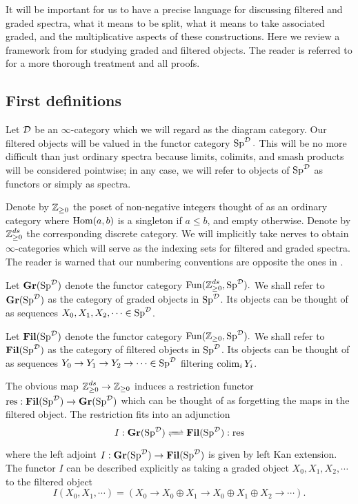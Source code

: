 
It will be important for us to have a precise language for discussing filtered and graded spectra, what it means to be split, what it means to take associated graded, and the multiplicative aspects of these constructions. Here we review a framework from \cite{LurieRot} for studying graded and filtered objects.  The reader is referred to \cite{LurieRot} for a more thorough treatment and all proofs.  

\subsection{First definitions}
Let $\operatorname{\mathcal{D}}$ be an $\infty$-category which we will regard as the diagram category.  Our filtered objects will be valued in the functor category $\operatorname{\mathrm{Sp}}^{\operatorname{\mathcal{D}}}.$  This will be no more difficult than just ordinary spectra because limits, colimits, and smash products will be considered pointwise; in any case, we will refer to objects of $\operatorname{\mathrm{Sp}}^{\operatorname{\mathcal{D}}}$ as functors or simply as spectra.  

Denote by $\operatorname{\mathbb{Z}}_{\geq 0}$ the poset of non-negative integers thought of as an ordinary category where $\operatorname{\text{Hom}}(a,b)$ is a singleton if $a\leq b$, and empty otherwise.  Denote by $\operatorname{\mathbb{Z}}_{\geq 0}^{ds}$ the corresponding discrete category.  We will implicitly take nerves to obtain $\infty$-categories which will serve as the indexing sets for filtered and graded spectra.  The reader is warned that our numbering conventions are opposite the ones in \cite{LurieRot}.

\begin{dfn} 
Let $\operatorname{\mathbf{Gr}}(\operatorname{\mathrm{Sp}}^{\operatorname{\mathcal{D}}})$ denote the functor category $\operatorname{\text{Fun}}(\operatorname{\mathbb{Z}}_{\geq 0}^{ds}, \operatorname{\mathrm{Sp}}^{\operatorname{\mathcal{D}}}).$  We shall refer to $\operatorname{\mathbf{Gr}}(\operatorname{\mathrm{Sp}}^{\operatorname{\mathcal{D}}})$ as the category of graded objects in $\operatorname{\mathrm{Sp}}^{\operatorname{\mathcal{D}}}$.  Its objects can be thought of as sequences $X_0, X_1,X_2,\cdots \in \operatorname{\mathrm{Sp}}^{\operatorname{\mathcal{D}}}$.
\end{dfn}

\begin{dfn} 
Let $\operatorname{\mathbf{Fil}}(\operatorname{\mathrm{Sp}}^{\operatorname{\mathcal{D}}})$ denote the functor category $\operatorname{\text{Fun}}(\operatorname{\mathbb{Z}}_{\geq 0}, \operatorname{\mathrm{Sp}}^{\operatorname{\mathcal{D}}}).$  We shall refer to $\operatorname{\mathbf{Fil}}(\operatorname{\mathrm{Sp}}^{\operatorname{\mathcal{D}}})$ as the category of filtered objects in $\operatorname{\mathrm{Sp}}^{\operatorname{\mathcal{D}}}$.  Its objects can be thought of as sequences $Y_0\to Y_1\to Y_2 \to \cdots \in \operatorname{\mathrm{Sp}}^{\operatorname{\mathcal{D}}}$ filtering $\operatorname*{\mathrm{colim}}_i Y_i$.  
\end{dfn}


The obvious map $\operatorname{\mathbb{Z}}_{\geq 0}^{ds} \to \operatorname{\mathbb{Z}}_{\geq 0}$ induces a restriction functor $\text{res}: \operatorname{\mathbf{Fil}}(\operatorname{\mathrm{Sp}}^{\operatorname{\mathcal{D}}}) \to \operatorname{\mathbf{Gr}}(\operatorname{\mathrm{Sp}}^{\operatorname{\mathcal{D}}})$ which can be thought of as forgetting the maps in the filtered object.  The restriction fits into an adjunction  
$$I:\Gr(\Sp^{\D}) \xrightleftharpoons{\quad} \Fil(\Sp^{\D}) : \text{res}$$
where the left adjoint $I: \operatorname{\mathbf{Gr}}(\operatorname{\mathrm{Sp}}^{\operatorname{\mathcal{D}}}) \to \operatorname{\mathbf{Fil}}(\operatorname{\mathrm{Sp}}^{\operatorname{\mathcal{D}}})$ is given by left Kan extension.  The functor $I$ can be described explicitly as taking a graded object $X_0,X_1,X_2,\cdots$ to the filtered object $$I(X_0, X_1, \cdots) = (X_0\to X_0\oplus X_1\to X_0 \oplus X_1\oplus X_2\to \cdots).$$   

